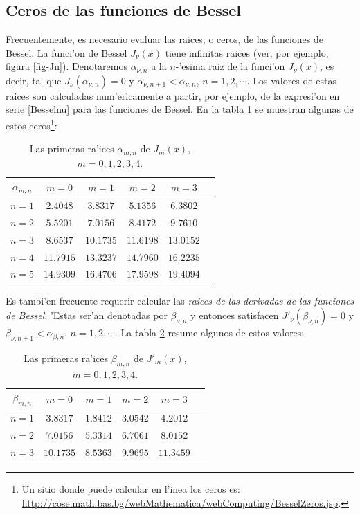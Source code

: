 \subsection{Ceros de las funciones de Bessel}
Frecuentemente, es necesario evaluar las raices, o ceros, de las funciones de Bessel. La funci'on de Bessel $J_\nu(x)$ tiene infinitas raices (ver, por ejemplo, figura \ref{fig-Jn}). Denotaremos $\alpha_{\nu,n}$ a la $n$-'esima raiz de la funci'on $J_\nu(x)$, es decir, tal que $J_\nu(\alpha_{\nu,n})=0$ y $\alpha_{\nu,n+1}<\alpha_{\nu,n}$, $n=1,2,\cdots$. Los valores de estas raices son calculadas num'ericamente a partir, por ejemplo, de la expresi'on en serie \eqref{Besselnu} para las funciones de Bessel. En la tabla \ref{tabla:alphanun} se muestran algunas de estos ceros\footnote{Un sitio donde puede calcular en l'inea los ceros es: \url{http://cose.math.bas.bg/webMathematica/webComputing/BesselZeros.jsp}.}:
\begin{table}
\begin{center}
\begin{tabular}{cccccc}
\hline $\alpha_{m,n}$ & $m=0$ & $m=1$ & $m=2$ & $m=3$ \\ \hline 
$n=1$ & $2.4048$ & $3.8317$ & $5.1356$ & $6.3802$  \\ 
$n=2$ & $5.5201$ & $7.0156$ & $8.4172$ & $9.7610$  \\ 
$n=3$ & $8.6537$ & $10.1735$ & $11.6198$ & $13.0152$  \\ 
$n=4$ & $11.7915$ & $13.3237$ & $14.7960$ & $16.2235$  \\ 
$n=5$ & $14.9309$ & $16.4706$ & $17.9598$ & $19.4094$ \\
\hline 
\end{tabular} 
\caption{Las primeras ra'ices $\alpha_{m,n}$ de $J_m(x)$, $m=0,1,2,3,4$.}
\label{tabla:alphanun}
\end{center}
\end{table}

Es tambi'en frecuente requerir calcular las \textit{raices de las derivadas de las funciones de Bessel}. 'Estas ser'an denotadas por $\beta_{\nu,n}$ y entonces satisfacen $J'_\nu(\beta_{\nu,n})=0$ y $\beta_{\nu,n+1}<\alpha_{\beta,n}$, $n=1,2,\cdots$. La tabla  \ref{tabla:betanun} resume algunos de estos valores:
\begin{table}
\begin{center}
\begin{tabular}{cccccc}
\hline $\beta_{m,n}$ & $m=0$ & $m=1$ & $m=2$ & $m=3$ \\ \hline 
$n=1$ & $3.8317$ & $1.8412$ & $3.0542$ & $4.2012$  \\ 
$n=2$ & $7.0156$ & $5.3314$ & $6.7061$ & $8.0152$  \\ 
$n=3$ & $10.1735$ & $8.5363$ & $9.9695$ & $11.3459$ \\ 
\hline 
\end{tabular} 
\caption{Las primeras ra'ices $\beta_{m,n}$ de $J'_m(x)$, $m=0,1,2,3,4$.}
\label{tabla:betanun}
\end{center}
\end{table}

